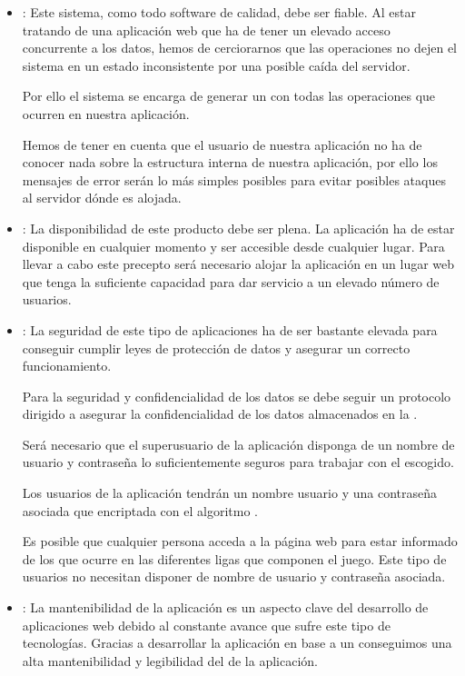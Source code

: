 \begin{itemize}
\item {}: Este sistema, como todo software de calidad, debe
  ser fiable. Al estar tratando de una aplicación web que ha de tener un elevado
  acceso concurrente a los datos, hemos de cerciorarnos que las operaciones no
  dejen el sistema en un estado inconsistente por una posible caída del
  servidor.

  Por ello el sistema se encarga de generar un  con todas las
  operaciones que ocurren en nuestra aplicación.

  Hemos de tener en cuenta que el usuario de nuestra aplicación no ha de conocer
  nada sobre la estructura interna de nuestra aplicación, por ello los mensajes
  de error serán lo más simples posibles para evitar posibles ataques al
  servidor dónde es alojada.

\item {}: La disponibilidad de este producto debe ser
  plena. La aplicación ha de estar disponible en cualquier momento y ser
  accesible desde cualquier lugar. Para llevar a cabo este precepto será
  necesario alojar la aplicación en un lugar web que tenga la suficiente
  capacidad para dar servicio a un elevado número de usuarios.

\item {}: La seguridad de este tipo de aplicaciones ha de ser
  bastante elevada para conseguir cumplir leyes de protección de datos y
  asegurar un correcto funcionamiento.

  Para la seguridad y confidencialidad de los datos se debe seguir un protocolo
  dirigido a asegurar la confidencialidad de los datos almacenados en la
  .

  Será necesario que el superusuario de la aplicación disponga de un nombre de
  usuario y contraseña lo suficientemente seguros para trabajar con el
   escogido.

  Los usuarios de la aplicación tendrán un nombre usuario y una contraseña
  asociada que encriptada con el algoritmo .

  Es posible que cualquier persona acceda a la página web para estar informado
  de los que ocurre en las diferentes ligas que componen el juego. Este tipo de
  usuarios no necesitan disponer de nombre de usuario y contraseña asociada.

\item {}: La mantenibilidad de la aplicación es un aspecto
  clave del desarrollo de aplicaciones web debido al constante avance que sufre
  este tipo de tecnologías. Gracias a desarrollar la aplicación en base a un
   conseguimos una alta
  mantenibilidad y legibilidad del  de la aplicación.


\end{itemize}
